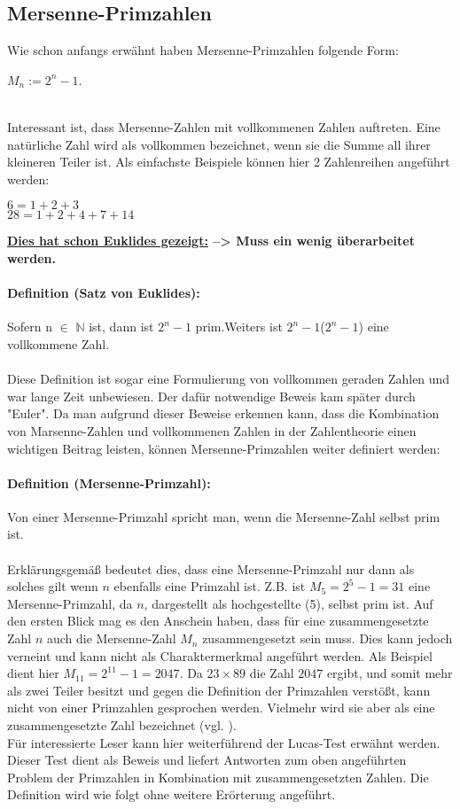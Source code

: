 \documentclass[german,12pt,a4paper]{article}
\begin{document}
\subsection{Mersenne-Primzahlen}
Wie schon anfangs erwähnt haben Mersenne-Primzahlen folgende Form:\\
\begin{center}
$M_n := 2^{n}-1$.
\end{center}\
\\Interessant ist, dass Mersenne-Zahlen mit vollkommenen Zahlen auftreten. Eine natürliche Zahl wird als vollkommen bezeichnet, wenn sie die Summe all ihrer kleineren Teiler ist. Als einfachste Beispiele können hier 2 Zahlenreihen angeführt werden:
\begin{center}
$6 = 1+2+3$\\
$28 = 1+2+4+7+14$
\end{center}
\textbf{\underline{Dies hat schon Euklides gezeigt:} --> Muss ein wenig überarbeitet werden.}
\paragraph{Definition (Satz von Euklides):}Sofern n $\in$ $\mathbb{N}$ ist, dann ist $2^{n}-1$ prim.Weiters ist $2^{n}-1$($2^{n}-1$) eine vollkommene Zahl.\\
\\Diese Definition ist sogar eine Formulierung von vollkommen geraden Zahlen und war lange Zeit unbewiesen. Der dafür notwendige Beweis kam später durch "{Euler}". Da man aufgrund dieser Beweise erkennen kann, dass die Kombination von Marsenne-Zahlen und vollkommenen Zahlen in der Zahlentheorie einen wichtigen Beitrag leisten, können Mersenne-Primzahlen weiter definiert werden:
\paragraph{Definition (Mersenne-Primzahl):}Von einer Mersenne-Primzahl spricht man, wenn die Mersenne-Zahl selbst prim ist.\\
\\Erklärungsgemäß bedeutet dies, dass eine Mersenne-Primzahl nur dann als solches gilt wenn $n$ ebenfalls eine Primzahl ist. Z.B. ist $M_5 = 2^{5}-1 = 31$ eine Mersenne-Primzahl, da $n$, dargestellt als hochgestellte (5), selbst prim ist. Auf den ersten Blick mag es den Anschein haben, dass für eine zusammengesetzte Zahl $n$ auch die Mersenne-Zahl $M_n$ zusammengesetzt sein muss. Dies kann jedoch verneint und kann nicht als Charaktermerkmal angeführt werden. Als Beispiel dient hier $M_{11} = 2^{11}-1 = 2047$. Da $23 \times 89$ die Zahl $2047$ ergibt, und somit mehr als zwei Teiler besitzt und gegen die Definition der Primzahlen verstößt, kann nicht von einer Primzahlen gesprochen werden. Vielmehr wird sie aber als eine zusammengesetzte Zahl bezeichnet (vgl. \cite[168--169]{RempeGillen2009}).\\
Für interessierte Leser kann hier weiterführend der Lucas-Test erwähnt werden. Dieser Test dient als Beweis und liefert Antworten zum oben angeführten Problem der Primzahlen in Kombination mit zusammengesetzten Zahlen. Die Definition wird wie folgt ohne weitere Erörterung angeführt.
\end{document}
